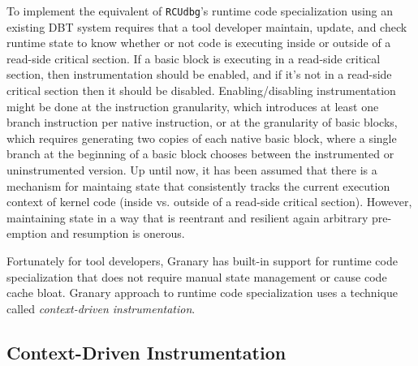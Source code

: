 \documentclass[preprint]{sigplanconf}
\begin{document}
To implement the equivalent of \texttt{RCUdbg}'s runtime code specialization using an existing DBT system requires that a tool developer maintain, update, and check runtime state to know whether or not code is executing inside or outside of a read-side critical section. If a basic block is executing in a read-side critical section, then instrumentation should be enabled, and if it's not in a read-side critical section then it should be disabled. Enabling/disabling instrumentation might be done at the instruction granularity, which introduces at least one branch instruction per native instruction, or at the granularity of basic blocks, which requires generating two copies of each native basic block, where a single branch at the beginning of a basic block chooses between the instrumented or uninstrumented version. Up until now, it has been assumed that there is a mechanism for maintaing state that consistently tracks the current execution context of kernel code (inside vs. outside of a read-side critical section). However, maintaining state in a way that is reentrant and resilient again arbitrary pre-emption and resumption is onerous.


Fortunately for tool developers, Granary has built-in support for runtime code specialization that does not require manual state management or cause code cache bloat. Granary approach to runtime code specialization uses a technique called \emph{context-driven instrumentation}.


\subsection{Context-Driven Instrumentation}\label{sec:policies}
\end{document}
